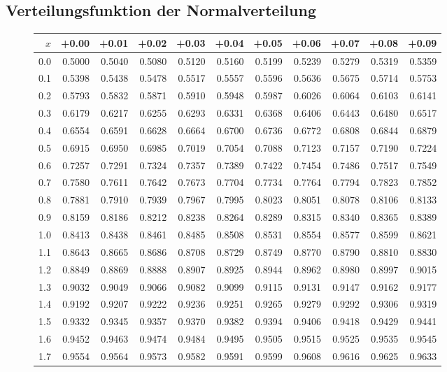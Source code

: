\subsection{Verteilungsfunktion der Normalverteilung}
\begin{figure}[!h]
\begin{center}
\scriptsize
\begin{tabular}{|r|rrrrrrrrrr|}
\hline
$x$&+0.00&+0.01&+0.02&+0.03&+0.04&+0.05&+0.06&+0.07&+0.08&+0.09\\
\hline
0.0&0.5000&0.5040&0.5080&0.5120&0.5160&0.5199&0.5239&0.5279&0.5319&0.5359\\
0.1&0.5398&0.5438&0.5478&0.5517&0.5557&0.5596&0.5636&0.5675&0.5714&0.5753\\
0.2&0.5793&0.5832&0.5871&0.5910&0.5948&0.5987&0.6026&0.6064&0.6103&0.6141\\
0.3&0.6179&0.6217&0.6255&0.6293&0.6331&0.6368&0.6406&0.6443&0.6480&0.6517\\
0.4&0.6554&0.6591&0.6628&0.6664&0.6700&0.6736&0.6772&0.6808&0.6844&0.6879\\
0.5&0.6915&0.6950&0.6985&0.7019&0.7054&0.7088&0.7123&0.7157&0.7190&0.7224\\
0.6&0.7257&0.7291&0.7324&0.7357&0.7389&0.7422&0.7454&0.7486&0.7517&0.7549\\
0.7&0.7580&0.7611&0.7642&0.7673&0.7704&0.7734&0.7764&0.7794&0.7823&0.7852\\
0.8&0.7881&0.7910&0.7939&0.7967&0.7995&0.8023&0.8051&0.8078&0.8106&0.8133\\
0.9&0.8159&0.8186&0.8212&0.8238&0.8264&0.8289&0.8315&0.8340&0.8365&0.8389\\
1.0&0.8413&0.8438&0.8461&0.8485&0.8508&0.8531&0.8554&0.8577&0.8599&0.8621\\
1.1&0.8643&0.8665&0.8686&0.8708&0.8729&0.8749&0.8770&0.8790&0.8810&0.8830\\
1.2&0.8849&0.8869&0.8888&0.8907&0.8925&0.8944&0.8962&0.8980&0.8997&0.9015\\
1.3&0.9032&0.9049&0.9066&0.9082&0.9099&0.9115&0.9131&0.9147&0.9162&0.9177\\
1.4&0.9192&0.9207&0.9222&0.9236&0.9251&0.9265&0.9279&0.9292&0.9306&0.9319\\
1.5&0.9332&0.9345&0.9357&0.9370&0.9382&0.9394&0.9406&0.9418&0.9429&0.9441\\
1.6&0.9452&0.9463&0.9474&0.9484&0.9495&0.9505&0.9515&0.9525&0.9535&0.9545\\
1.7&0.9554&0.9564&0.9573&0.9582&0.9591&0.9599&0.9608&0.9616&0.9625&0.9633\\

\end{tabular}
\end{center}
\end{figure}
